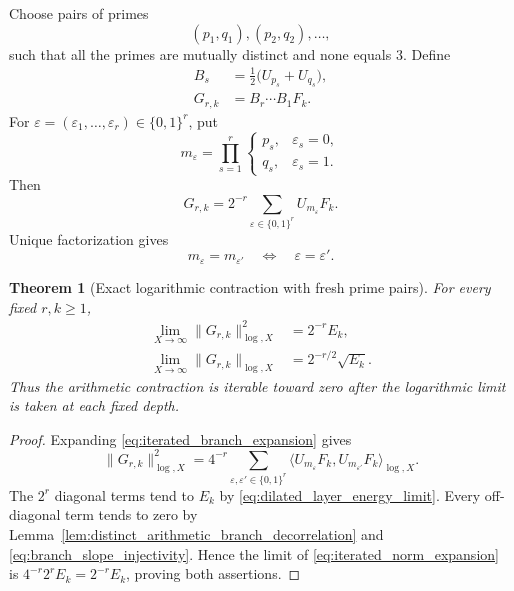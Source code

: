 \documentclass[11pt]{amsart}
\numberwithin{equation}{section}
\theoremstyle{plain}
\newtheorem{theorem}{Theorem}[section]
\theoremstyle{definition}
\theoremstyle{remark}
\begin{document}
Choose pairs of primes
\begin{equation}
(p_1,q_1),(p_2,q_2),\ldots,
\label{eq:fresh_prime_pairs}
\end{equation}
such that all the primes are mutually distinct and none equals $3$.  Define
\begin{align}
B_s
&=
\frac12\bigl(U_{p_s}+U_{q_s}\bigr),
\label{eq:fresh_pair_operator}
\\
G_{r,k}
&=
B_r\cdots B_1F_k.
\label{eq:iterated_arithmetic_layer}
\end{align}
For $\varepsilon=(\varepsilon_1,\ldots,\varepsilon_r)\in\{0,1\}^r$, put
\begin{equation}
m_\varepsilon
=
\prod_{s=1}^r
\begin{cases}
p_s,&\varepsilon_s=0,\\
q_s,&\varepsilon_s=1.
\end{cases}
\label{eq:arithmetic_branch_slope}
\end{equation}
Then
\begin{equation}
G_{r,k}
=
2^{-r}
\sum_{\varepsilon\in\{0,1\}^r}U_{m_\varepsilon}F_k.
\label{eq:iterated_branch_expansion}
\end{equation}
Unique factorization gives
\begin{equation}
m_\varepsilon=m_{\varepsilon'}
\quad\Longleftrightarrow\quad
\varepsilon=\varepsilon'.
\label{eq:branch_slope_injectivity}
\end{equation}

\begin{theorem}[Exact logarithmic contraction with fresh prime pairs]
\label{thm:fresh_prime_exponential_contraction}
For every fixed $r,k\geq1$,
\begin{align}
\lim_{X\to\infty}
\|G_{r,k}\|_{\log,X}^2
&=
2^{-r}E_k,
\label{eq:fresh_prime_squared_contraction}
\\
\lim_{X\to\infty}
\|G_{r,k}\|_{\log,X}
&=
2^{-r/2}\sqrt{E_k}.
\label{eq:fresh_prime_norm_contraction}
\end{align}
Thus the arithmetic contraction is iterable toward zero after the logarithmic limit is taken at each fixed depth.
\end{theorem}

\begin{proof}
Expanding \eqref{eq:iterated_branch_expansion} gives
\begin{equation}
\|G_{r,k}\|_{\log,X}^2
=
4^{-r}
\sum_{\varepsilon,\varepsilon'\in\{0,1\}^r}
\langle U_{m_\varepsilon}F_k,
U_{m_{\varepsilon'}}F_k\rangle_{\log,X}.
\label{eq:iterated_norm_expansion}
\end{equation}
The $2^r$ diagonal terms tend to $E_k$ by \eqref{eq:dilated_layer_energy_limit}.  Every off-diagonal term tends to zero by Lemma~\ref{lem:distinct_arithmetic_branch_decorrelation} and \eqref{eq:branch_slope_injectivity}.  Hence the limit of \eqref{eq:iterated_norm_expansion} is $4^{-r}2^rE_k=2^{-r}E_k$, proving both assertions.
\end{proof}
\end{document}
